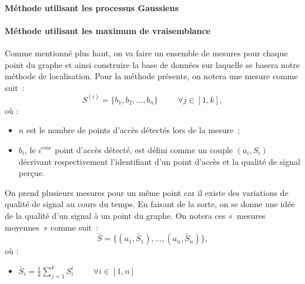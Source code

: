 \documentclass[11pt,journal,compsoc]{IEEEtran}
\begin{document}
	  \paragraph{Méthode utilisant les processus Gaussiens}

	  \paragraph{Méthode utilisant les maximum de vraisemblance}
        Comme mentionné plus haut, on va faire un ensemble de mesures pour chaque point du graphe et ainsi construire la base de données sur laquelle se basera notre
		méthode de localisation. Pour la méthode présente, on notera une mesure comme suit~:
        \begin{equation}
          S^{(i)}=\{b_{1}, b_{2}, ..., b_{n}\} \hspace{1cm} \forall j \in [1, k],  %
        \end{equation}
        où :
        \begin{itemize}
          \item $n$ est le nombre de points d'accès détectés lors de la mesure~;
          \item $b_{i}$, le $i^{eme}$ point d'accès détecté, est défini comme un couple $(a_{i}, S_{i})$ décrivant respectivement l'identifiant d'un point d'accès
		  et la qualité de signal perçue.
        \end{itemize}

        On prend plusieurs mesures pour un même point car il existe des variations de qualité de signal au cours du temps. En faisant de la sorte, on se donne une idée de
		la qualité d'un signal à un point du graphe. On notera ces «~mesures moyennes~» comme suit~:
        \begin{equation}
          \bar{S} = \{(a_{1}, \bar{S}_{1}), ..., (a_{n}, \bar{S}_{n})\},
        \end{equation}
        où :
        \begin{itemize}
          \item $\bar{S}_{i} = \frac{1}{k}\sum\limits_{j = 1}^{k} S_{i}^{i} \hspace{1cm} \forall i \in [1, n]$
        \end{itemize}
\end{document}
